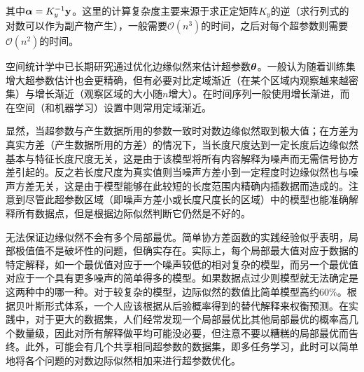 \documentclass[12pt,UTF8]{article}
\begin{document}
                其中$\vb*{\alpha}=K_y^{-1}\vb{y}$。这里的计算复杂度主要来源于求正定矩阵$K_y$的逆（求行列式的对数可以作为副产物产生），一般需要$\mathcal{O}(n^3)$的时间，之后对每个超参数则需要$\mathcal{O}(n^2)$的时间。\par
                空间统计学中已长期研究通过优化边缘似然来估计超参数$\vb*{\theta}$。一般认为随着训练集增大超参数估计也会更精确，但有必要对比定域渐近（在某个区域内观察越来越密集）与增长渐近（观察区域的大小随$n$增大）。在时间序列一般使用增长渐进，而在空间（和机器学习）设置中则常用定域渐近。\par
                显然，当超参数与产生数据所用的参数一致时对数边缘似然取到极大值；在方差为真实方差（产生数据所用的方差）的情况下，当长度尺度达到一定长度后边缘似然基本与特征长度尺度无关，这是由于该模型将所有内容解释为噪声而无需信号协方差引起的。反之若长度尺度为真实值则当噪声方差小到一定程度时边缘似然也与噪声方差无关，这是由于模型能够在此较短的长度范围内精确内插数据而造成的。注意到尽管此超参数区域（即噪声方差小或长度尺度长的区域）中的模型也能准确解释所有数据点，但是根据边际似然判断它仍然是不好的。\par
                无法保证边缘似然不会有多个局部最优。简单协方差函数的实践经验似乎表明，局部极值值不是破坏性的问题，但确实存在。实际上，每个局部最大值对应于数据的特定解释，如一个最优值对应于一个噪声较低的相对复杂的模型，而另一个最优值对应于一个具有更多噪声的简单得多的模型。如果数据点过少则模型就无法确定是这两种中的哪一种。对于较复杂的模型，边际似然的数值比简单模型高约$60\%$。根据贝叶斯形式体系，一个人应该根据从后验概率得到的替代解释来权衡预测。在实践中，对于更大的数据集，人们经常发现一个局部最优比其他局部最优的概率高几个数量级，因此对所有解释做平均可能没必要，但注意不要以糟糕的局部最优而告终。此外，可能会有几个共享相同超参数的数据集，即多任务学习，此时可以简单地将各个问题的对数边际似然相加来进行超参数优化。
\end{document}

